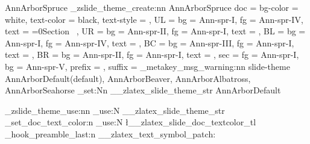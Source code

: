 {  %
  {AnnArborSpruce}{
    \_zslide_theme_create:nn {AnnArborSpruce}{
      doc = {
        bg-color = white,
        text-color = black,
        text-style = \sfdefault
      },
      UL = {
        bg   = Ann-spr-I,
        fg   = Ann-spr-IV,
        text = {\ifnum{}=0\else Section\ \thesection\fi}
      },
      UR = {
        bg   = Ann-spr-II,
        fg   = Ann-spr-I,
        text = {\zslideDefaultUR}
      },
      BL = {
        bg   = Ann-spr-I,
        fg   = Ann-spr-IV,
        text = \zslideAuthor
      },
      BC = {
        bg   = Ann-spr-III,
        fg   = Ann-spr-I,
        text = \zslideTitle
      },
      BR = {
        bg   = Ann-spr-II,
        fg   = Ann-spr-I,
        text = \zslideDefaultBR
      },
      sec = {
        fg   = Ann-spr-I,
        bg   = Ann-spr-V,
        prefix = {},
        suffix = {}
      }
    }
  }
}{
  \zlatex_metakey_msg_warning:nn {slide-theme}{
    AnnArborDefault(default), AnnArborBeaver, 
    AnnArborAlbatross, AnnArborSeahorse
  }
  \str_set:Nn \g__zlatex_slide_theme_str {AnnArborDefault}
}


\_zslide_theme_use:nn { \str_use:N \g__zlatex_slide_theme_str }{}
\zslide_set_doc_text_color:n { \tl_use:N \l__zlatex_slide_doc_textcolor_tl }
\renewcommand{\familydefault}{ \tl_use:N \l__zlatex_slide_doc_textstyle_tl }
\zlatex_hook_preamble_last:n 
  { 
    \pagestyle{empty} 
    \__zlatex_text_symbol_patch:
  }
